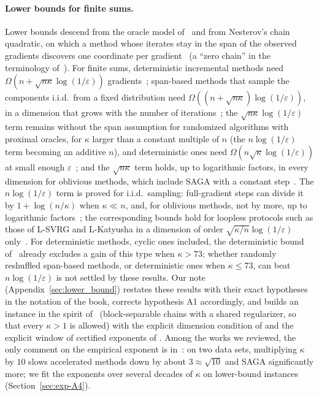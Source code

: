 \paragraph{Lower bounds for finite sums.}
Lower bounds descend from the oracle model of~\cite{nemirovsky1983problem} and from Nesterov's chain quadratic, on
which a method whose iterates stay in the span of the observed gradients discovers one coordinate per
gradient~\cite[Theorem~2.1.13]{nesterov2018lectures} (a ``zero chain'' in the terminology of~\cite{carmon2020lower}).
For finite sums, deterministic incremental methods need $\Omega(n+\sqrt{n\kappa}\log(1/\varepsilon))$
gradients~\cite{agarwal2015lower}; span-based methods that sample the components i.i.d.\ from a fixed distribution
need $\Omega((n+\sqrt{n\kappa})\log(1/\varepsilon))$, in a dimension that grows with the number of
iterations~\cite{lan2018optimal}; the $\sqrt{n\kappa}\log(1/\varepsilon)$ term remains without the span assumption for
randomized algorithms with proximal oracles, for $\kappa$ larger than a constant multiple of $n$ (the
$n\log(1/\varepsilon)$ term becoming an additive $n$), and deterministic ones need $\Omega(n\sqrt\kappa\log(1/\varepsilon))$ at small enough
$\varepsilon$~\cite{woodworth2016tight}; and the $\sqrt{n\kappa}$ term holds, up to logarithmic factors, in every
dimension for oblivious methods, which include SAGA with a constant step~\cite{arjevani2016dimension}. The
$n\log(1/\varepsilon)$ term is proved for i.i.d.\ sampling: full-gradient steps can divide it by $1+\log(n/\kappa)$
when $\kappa\ll n$, and, for oblivious methods, not by more, up to logarithmic factors~\cite{hannah2018breaking}; the
corresponding bounds hold for loopless protocols such as those of L-SVRG and L-Katyusha in a dimension of order
$\sqrt{\kappa/n}\log(1/\varepsilon)$ only~\cite{han2024lower}. For
deterministic methods, cyclic ones included, the deterministic bound of~\cite{woodworth2016tight} already excludes a
gain of this type when $\kappa>73$; whether randomly reshuffled span-based methods, or deterministic ones when
$\kappa\le73$, can beat $n\log(1/\varepsilon)$ is not settled by these results. Our note
(Appendix~\ref{sec:lower_bound}) restates these results with their exact hypotheses in the notation of the book,
corrects hypothesis A1 accordingly, and builds an instance in the spirit of~\cite{agarwal2015lower,lan2018optimal}
(block-separable chains with a shared regularizer, so that every $\kappa>1$ is allowed) with the explicit dimension
condition of  and the explicit window of certified exponents of . Among the
works we reviewed, the only comment on the empirical exponent is in~\cite{zhou2019direct}: on two data sets,
multiplying $\kappa$ by $10$ slows accelerated methods down by about $3\approx\sqrt{10}$ and SAGA significantly more;
we fit the exponents over several decades of $\kappa$ on lower-bound instances (Section~\ref{sec:exp-A4}).

